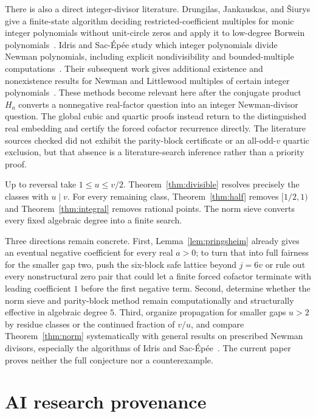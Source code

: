 \documentclass[11pt]{article}
\theoremstyle{remark}
\numberwithin{equation}{section}
\begin{document}
There is also a direct integer-divisor literature.  Drungilas, Jankauskas, and
\v{S}iurys give a finite-state algorithm deciding restricted-coefficient
multiples for monic integer polynomials without unit-circle zeros and apply it
to low-degree Borwein polynomials~\cite{DJS}.  Idris and Sac-\'Ep\'ee study
which integer polynomials divide Newman polynomials, including explicit
nondivisibility and bounded-multiple computations~\cite{IS}.  Their subsequent
work gives additional existence and nonexistence results for Newman and
Littlewood multiples of certain integer polynomials~\cite{IS2}.  These methods
become relevant here after the conjugate product $H_a$ converts a nonnegative
real-factor question into an integer Newman-divisor question.  The global cubic
and quartic proofs instead return to the distinguished real embedding and
certify the forced cofactor recurrence directly.  The literature sources
checked did not exhibit the parity-block certificate or an all-odd-$v$ quartic
exclusion, but that absence is a literature-search inference rather than a
priority proof.

Up to reversal take $1\le u\le v/2$.  Theorem~\ref{thm:divisible} resolves
precisely the classes with $u\mid v$.  For every remaining class,
Theorem~\ref{thm:half} removes $[1/2,1)$ and Theorem~\ref{thm:integral}
removes rational points.  The norm sieve converts every fixed algebraic degree
into a finite search.

Three directions remain concrete.  First, Lemma~\ref{lem:pringsheim} already
gives an eventual negative coefficient for every real $a>0$; to turn that into
full fairness for the smaller gap two, push the six-block safe lattice beyond
$j=6v$ or rule out every nonstructural zero pair that could let a finite forced
cofactor terminate with leading coefficient $1$ before the first negative
term.
Second, determine whether the norm sieve and parity-block method remain
computationally and structurally effective in algebraic degree $5$.  Third,
organize propagation for smaller gaps
$u>2$ by residue classes or the continued fraction of $v/u$, and compare
Theorem~\ref{thm:norm} systematically with general
results on prescribed Newman divisors, especially the algorithms of Idris and
Sac-\'Ep\'ee~\cite{IS}.  The current paper proves neither the full conjecture
nor a counterexample.

\section*{AI research provenance}
\end{document}
